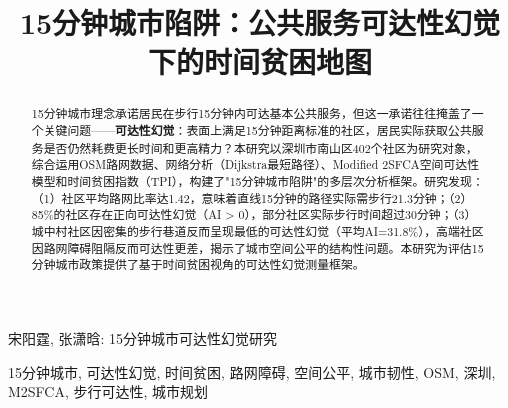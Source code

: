 \documentclass[10pt,conference]{IEEEtran}
\begin{document}
\title{15分钟城市陷阱：公共服务可达性幻觉下的时间贫困地图}

\author{
}

%
{宋阳霆, 张潇晗: 15分钟城市可达性幻觉研究}

\maketitle

\begin{abstract}
15分钟城市理念承诺居民在步行15分钟内可达基本公共服务，但这一承诺往往掩盖了一个关键问题——\textbf{可达性幻觉}：表面上满足15分钟距离标准的社区，居民实际获取公共服务是否仍然耗费更长时间和更高精力？本研究以深圳市南山区402个社区为研究对象，综合运用OSM路网数据、网络分析（Dijkstra最短路径）、Modified 2SFCA空间可达性模型和时间贫困指数（TPI），构建了"15分钟城市陷阱"的多层次分析框架。研究发现：（1）社区平均路网比率达1.42，意味着直线15分钟的路径实际需步行21.3分钟；（2）85\%的社区存在正向可达性幻觉（AI > 0），部分社区实际步行时间超过30分钟；（3）城中村社区因密集的步行巷道反而呈现最低的可达性幻觉（平均AI=31.8\%），高端社区因路网障碍阻隔反而可达性更差，揭示了城市空间公平的结构性问题。本研究为评估15分钟城市政策提供了基于时间贫困视角的可达性幻觉测量框架。
\end{abstract}

\begin{IEEEkeywords}
15分钟城市, 可达性幻觉, 时间贫困, 路网障碍, 空间公平, 城市韧性, OSM, 深圳, M2SFCA, 步行可达性, 城市规划
\end{IEEEkeywords}

\IEEEpeerreviewmaketitle

\end{document}
